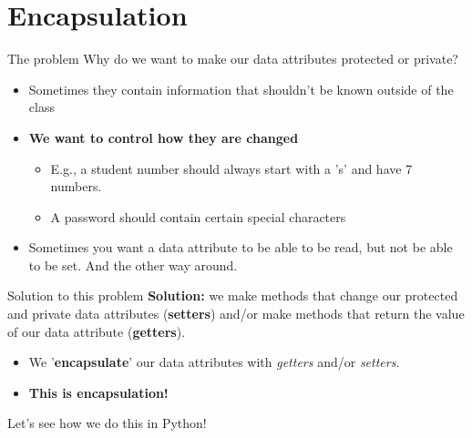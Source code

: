 \section{Encapsulation}

\begin{frame}{The problem}
Why do we want to make our data attributes protected or private?
\begin{itemize}
    \pause
    \item Sometimes they contain information that shouldn't be known outside of the class
    \pause
    \item \textbf{We want to control how they are changed}
    \begin{itemize}
        \pause
        \item E.g., a student number should always start with a 's' and have 7 numbers.
        \pause
        \item A password should contain certain special characters
    \end{itemize}
    \pause
    \item Sometimes you want a data attribute to be able to be read, but not be able to be set. And the other way around.
\end{itemize}
\end{frame}

\begin{frame}{Solution to this problem}
\textbf{Solution:} we make methods that change our protected and private data attributes (\textbf{setters}) and/or make methods that return the value of our data attribute (\textbf{getters}).
\pause
\begin{itemize}
    \item We '\textbf{encapsulate}' our data attributes with \textit{getters} and/or \textit{setters}.
    \pause
    \item \textbf{This is encapsulation!}
\end{itemize}
\end{frame}

\begin{frame}[plain]
    Let's see how we do this in Python!
\end{frame}

